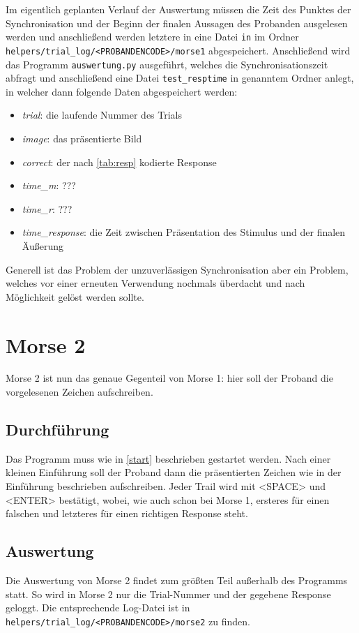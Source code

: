 \documentclass[a4paper]{scrartcl}
\newtheorem[M]{thmL}{Definition}
\begin{document}
Im eigentlich geplanten Verlauf der Auswertung müssen die Zeit des Punktes der Synchronisation und der Beginn der finalen Aussagen des Probanden ausgelesen werden und anschließend werden letztere in eine Datei \verb+in+ im Ordner \verb+helpers/trial_log/<PROBANDENCODE>/morse1+ abgespeichert. Anschließend wird das Programm \verb+auswertung.py+ ausgeführt, welches die Synchronisationszeit abfragt und anschließend eine Datei \verb+test_resptime+ in genanntem Ordner anlegt, in welcher dann folgende Daten abgespeichert werden:
\begin{itemize}
	\item \emph{trial}: die laufende Nummer des Trials
	\item \emph{image}: das präsentierte Bild
	\item \emph{correct}: der nach \autoref{tab:resp} kodierte Response
	\item \emph{time\_m}: ???
	\item \emph{time\_r}: ???
	\item \emph{time\_response}: die Zeit zwischen Präsentation des Stimulus und der finalen Äußerung
\end{itemize}
Generell ist das Problem der unzuverlässigen Synchronisation aber ein Problem, welches vor einer erneuten Verwendung nochmals überdacht und nach Möglichkeit gelöst werden sollte.

\section{Morse 2}
Morse 2 ist nun das genaue Gegenteil von Morse 1: hier soll der Proband die vorgelesenen Zeichen aufschreiben.

\subsection{Durchführung}
Das Programm muss wie in \autoref{start} beschrieben gestartet werden. Nach einer kleinen Einführung soll der Proband dann die präsentierten Zeichen wie in der Einführung beschrieben aufschreiben. Jeder Trail wird mit <SPACE> und <ENTER> bestätigt, wobei, wie auch schon bei Morse 1, ersteres für einen falschen und letzteres für einen richtigen Response steht.

\subsection{Auswertung}
Die Auswertung von Morse 2 findet zum größten Teil außerhalb des Programms statt. So wird in Morse 2 nur die Trial-Nummer und der gegebene Response geloggt. Die entsprechende Log-Datei ist in \verb+helpers/trial_log/<PROBANDENCODE>/morse2+ zu finden.
\end{document}
